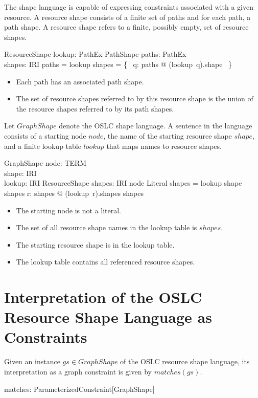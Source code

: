 The shape language is capable of expressing constraints associated with a given resource.
A resource shape consists of a finite set of paths and for each path, a path shape.
A resource shape refers to a finite, possibly empty, set of resource shapes.
\begin{schema}{ResourceShape}
lookup: PathEx \pfun PathShape
\also
paths: \finset PathEx \\
shapes: \finset IRI
\where
paths = \dom lookup
\also
shapes = \bigcup \{~ q: paths @ (lookup~q).shape ~\}
\end{schema}
\begin{itemize}
\item Each path has an associated path shape.
\item The set of resource shapes referred to by this resource shape is the union of the resource shapes referred to
by its path shapes.
\end{itemize}

Let $GraphShape$ denote the OSLC shape language. 
A sentence in the language consists of a starting node $node$, the name of the
starting resource shape $shape$, and a finite lookup table $lookup$ that maps names to resource shapes.
\begin{schema}{GraphShape}
node: TERM \\
shape: IRI \\
lookup: IRI \pfun ResourceShape
\also
shapes: \finset IRI
\where
node \notin Literal
\also
shapes = \dom lookup
\also
shape \in shapes
\also
\forall r: shapes @ (lookup~r).shapes \subseteq shapes
\end{schema}
\begin{itemize}
\item The starting node is not a literal.
\item The set of all resource shape names in the lookup table is $shapes$.
\item The starting resource shape is in the lookup table.
\item The lookup table contains all referenced resource shapes.
\end{itemize}

\section{Interpretation of the OSLC Resource Shape Language as Constraints}

Given an instance $gs \in GraphShape$ of the OSLC resource shape language, its interpretation as a graph
constraint is given by $matches(gs)$.
\begin{axdef}
matches: ParameterizedConstraint[GraphShape]
\end{axdef}

